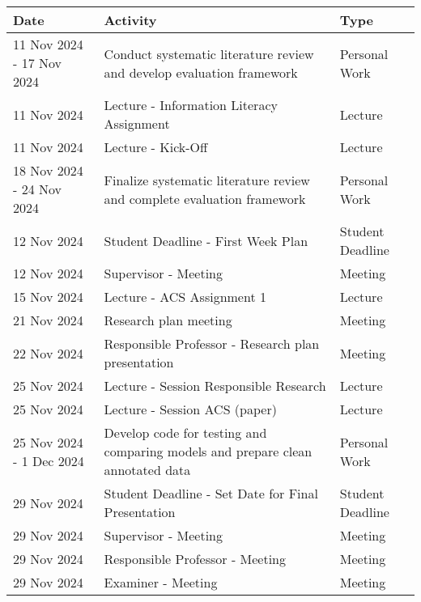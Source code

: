 \documentclass[
]{article}
\begin{document}
\begin{longtable}{p{} p{} p{}}
\toprule
\textbf{Date} & \textbf{Activity} & \textbf{Type} \\
\midrule
\endhead

11 Nov 2024 - 17 Nov 2024 & Conduct systematic literature review and develop evaluation framework & Personal Work \\

11 Nov 2024 & Lecture - Information Literacy Assignment & Lecture \\

11 Nov 2024 & Lecture - Kick-Off & Lecture \\

18 Nov 2024 - 24 Nov 2024 & Finalize systematic literature review and complete evaluation framework & Personal Work \\

12 Nov 2024 & Student Deadline - First Week Plan & Student Deadline \\

12 Nov 2024 & Supervisor - Meeting & Meeting \\

15 Nov 2024 & Lecture - ACS Assignment 1 & Lecture \\

21 Nov 2024 & Research plan meeting & Meeting \\

22 Nov 2024 & Responsible Professor - Research plan presentation & Meeting \\

25 Nov 2024 & Lecture - Session Responsible Research & Lecture \\

25 Nov 2024 & Lecture - Session ACS (paper) & Lecture \\

25 Nov 2024 - 1 Dec 2024 & Develop code for testing and comparing models and prepare clean annotated data & Personal Work \\

29 Nov 2024 & Student Deadline - Set Date for Final Presentation & Student Deadline \\

29 Nov 2024 & Supervisor - Meeting & Meeting \\

29 Nov 2024 & Responsible Professor - Meeting & Meeting \\

29 Nov 2024 & Examiner - Meeting & Meeting \\


\end{longtable}
\end{document}
